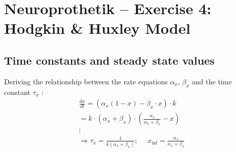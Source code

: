\documentclass[
a4paper, 
12pt, 
]{article}
\begin{document}
	
	\thispagestyle{firstpage} 			%
	
	\section*{Neuroprothetik -- Exercise 4: Hodgkin \& Huxley Model}
	\subsection{Time constants and steady state values}
	Deriving the relationship between the rate equations $\alpha_x$, $\beta_x$ and the time constant $\tau_x$ :
	\begin{align}
	\frac{dx}{dt} = (\alpha_x (1-x) - \beta_x \cdot x)\cdot k\\
	= k\cdot(\alpha_x + \beta_x)\cdot \left(\frac{\alpha_x}{\alpha_x + \beta_x}- x\right)\\
	\vdots \nonumber \\ 
	\Rightarrow \tau_x = \frac{1}{k(\alpha_x + \beta_x)};~~~~~~x_{\inf} = \frac{\alpha_x}{\alpha_x + \beta_x}
	\end{align}
	
\end{document}
